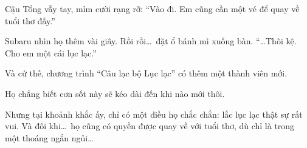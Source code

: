 \documentclass[../main.tex]{subfiles}
\begin{document}
Cậu Tổng vẫy tay, mỉm cười rạng rỡ: ``Vào đi. Em cũng cần một vé để quay về tuổi thơ đấy.''

Subaru nhìn họ thêm vài giây. Rồi rồi\dots\ đặt ổ bánh mì xuống bàn. ``\dots Thôi kệ. Cho em một cái lục lạc.''

Và cứ thế, chương trình ``Câu lạc bộ Lục lạc'' có thêm một thành viên mới.

Họ chẳng biết cơn sốt này sẽ kéo dài đến khi nào mới thôi.

Nhưng tại khoảnh khắc ấy, chỉ có một điều họ chắc chắn: lắc lục lạc thật sự rất vui. Và đôi khi\dots\ họ cũng có quyền được quay về với tuổi thơ, dù chỉ là trong một thoáng ngắn ngủi\dots
\end{document}
